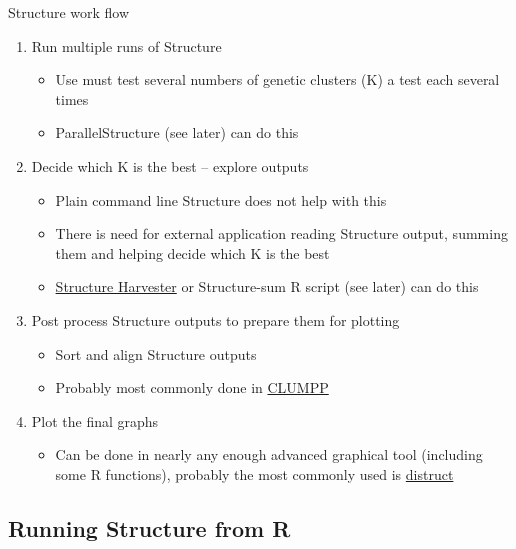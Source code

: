 \documentclass[compress, ucs, xelatex, 11pt, xcolor=svgnames,
  hyperref={
    bookmarks=true,
    unicode=true,
    colorlinks=true,
    pdftitle={Molecular data in R},
    plainpages=false,
    pdfauthor={Vojtech Zeisek},
    pdfsubject={Course about phylogeny and evolution in R},
    pdfcreator={XeLaTeX},
    pdfkeywords={R, evolution, phylogeny, molecular data},
    linkcolor=Tomato,
    anchorcolor=SaddleBrown,
    citecolor=Goldenrod,
    filecolor=DarkMagenta,
    menucolor=Sienna,
    urlcolor=DarkTurquoise,
    pdftex},
  url={hyphens, lowtilde} %
  ]{beamer}
\begin{document}
\begin{frame}{Structure work flow}
  \begin{enumerate}
    \item Run multiple runs of Structure
    \begin{itemize}
      \item Use must test several numbers of genetic clusters (K) a test each several times
      \item ParallelStructure (see later) can do this
    \end{itemize}
    \item Decide which K is the best -- explore outputs
    \begin{itemize}
      \item Plain command line Structure does not help with this
      \item There is need for external application reading Structure output, summing them and helping decide which K is the best
      \item \href{http://taylor0.biology.ucla.edu/structureHarvester/}{Structure Harvester} or Structure-sum R script (see later) can do this
    \end{itemize}
    \item Post process Structure outputs to prepare them for plotting
    \begin{itemize}
      \item Sort and align Structure outputs
      \item Probably most commonly done in \href{https://web.stanford.edu/group/rosenberglab/clumpp.html}{CLUMPP}
    \end{itemize}
    \item Plot the final graphs
    \begin{itemize}
      \item Can be done in nearly any enough advanced graphical tool (including some R functions), probably the most commonly used is \href{https://web.stanford.edu/group/rosenberglab/distruct.html}{distruct}
    \end{itemize}
  \end{enumerate}
\end{frame}

\subsection{Running Structure from R}
\end{document}
